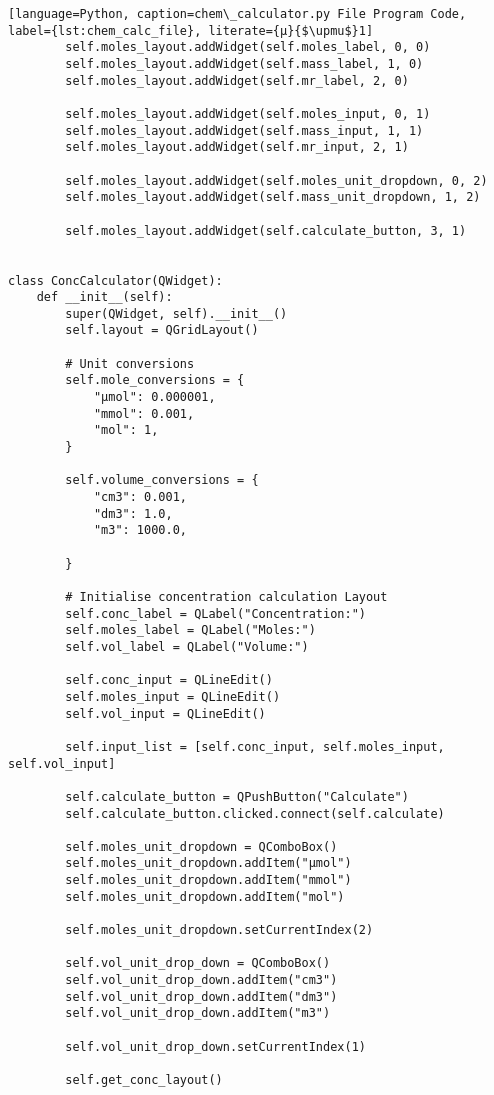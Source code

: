 \begin{lstlisting}[language=Python, caption=chem\_calculator.py File Program Code, label={lst:chem_calc_file}, literate={μ}{$\upmu$}1]
        self.moles_layout.addWidget(self.moles_label, 0, 0)
        self.moles_layout.addWidget(self.mass_label, 1, 0)
        self.moles_layout.addWidget(self.mr_label, 2, 0)

        self.moles_layout.addWidget(self.moles_input, 0, 1)
        self.moles_layout.addWidget(self.mass_input, 1, 1)
        self.moles_layout.addWidget(self.mr_input, 2, 1)

        self.moles_layout.addWidget(self.moles_unit_dropdown, 0, 2)
        self.moles_layout.addWidget(self.mass_unit_dropdown, 1, 2)

        self.moles_layout.addWidget(self.calculate_button, 3, 1)


class ConcCalculator(QWidget):
    def __init__(self):
        super(QWidget, self).__init__()
        self.layout = QGridLayout()

        # Unit conversions
        self.mole_conversions = {
            "μmol": 0.000001,
            "mmol": 0.001,
            "mol": 1,
        }

        self.volume_conversions = {
            "cm3": 0.001,
            "dm3": 1.0,
            "m3": 1000.0,

        }

        # Initialise concentration calculation Layout
        self.conc_label = QLabel("Concentration:")
        self.moles_label = QLabel("Moles:")
        self.vol_label = QLabel("Volume:")

        self.conc_input = QLineEdit()
        self.moles_input = QLineEdit()
        self.vol_input = QLineEdit()

        self.input_list = [self.conc_input, self.moles_input, self.vol_input]

        self.calculate_button = QPushButton("Calculate")
        self.calculate_button.clicked.connect(self.calculate)

        self.moles_unit_dropdown = QComboBox()
        self.moles_unit_dropdown.addItem("μmol")
        self.moles_unit_dropdown.addItem("mmol")
        self.moles_unit_dropdown.addItem("mol")

        self.moles_unit_dropdown.setCurrentIndex(2)

        self.vol_unit_drop_down = QComboBox()
        self.vol_unit_drop_down.addItem("cm3")
        self.vol_unit_drop_down.addItem("dm3")
        self.vol_unit_drop_down.addItem("m3")

        self.vol_unit_drop_down.setCurrentIndex(1)

        self.get_conc_layout()


\end{lstlisting}
